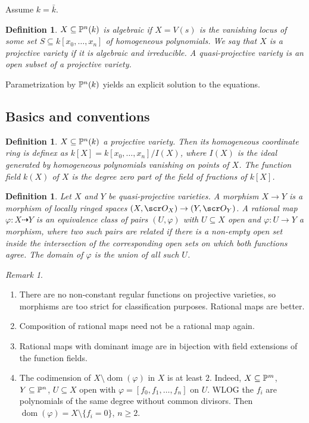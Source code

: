 \documentclass[A4paper, british, reqno]{amsart}
\theoremstyle{darkgreentheorem}
\theoremstyle{darkbluedefinition}
\newtheorem{defn}[thm]{Definition}
\theoremstyle{darkredexample}
\theoremstyle{remark}
\newtheorem{rem}[thm]{Remark}
\newcommand{\1}{\mathbbm{1}}
\newcommand{\sub}{\subseteq}
\begin{document}
Assume $k=\bar{k}$.

\begin{defn}
    $X\sub \P^{n}(k)$ is \textit{algebraic} if $X=V(s)$ is the vanishing locus of some set $S\sub k[x_{0},\ldots,x_{n}]$ of homogeneous polynomials.
    We say that $X$ is a \textit{projective variety} if it is algebraic and irreducible.
    A \textit{quasi-projective variety} is an open subset of a projective variety.
\end{defn}

Parametrization by $\P^{n}(k)$ yields an explicit solution to the equations.

\subsection{Basics and conventions}

\begin{defn}
    $X\sub \P^{n}(k)$ a projective variety.
    Then its \textit{homogeneous coordinate ring} is definex as $k[X]=k[x_{0},\ldots,x_{n}]/I(X)$, where $I(X)$ is the ideal generated by homogeneous polynomials vanishing on points of $X$.
    The \textit{function field} $k(X)$ of $X$ is the degree zero part of the field of fractions of $k[X]$.
\end{defn}

\begin{defn}
    Let $X$ and $Y$ be quasi-projective varieties.
    A \textit{morphism} $X\to Y$ is a morphism of locally ringed spaces $(X,\O_{X})\to (Y,\O_{Y})$.
    A \textit{rational map} $\varphi\colon X\dashrightarrow Y$ is an equivalence class of pairs $(U,\varphi)$ with $U\sub X$ open and $\varphi\colon U\to Y$ a morphism, where two such pairs are related if there is a non-empty open set inside the intersection of the corresponding open sets on which both functions agree.
    The domain of $\varphi$ is the union of all such $U$.
\end{defn}

\begin{rem}
    \begin{enumerate}
	\item There are no non-constant regular functions on projective varieties, so morphisms are too strict for classification purposes.
	    Rational maps are better.
	\item Composition of rational maps need not be a rational map again.
	\item Rational maps with dominant image are in bijection with field extensions of the function fields.
	\item The codimension of $X\setminus \operatorname{dom}(\varphi)$ in $X$ is at least $2$.
	    Indeed, $X\sub \P^{m}$, $Y\sub \P^{n}$, $U\sub X$ open with $\varphi=[f_{0},f_{1},\ldots,f_{n}]$ on $U$.
	    WLOG the $f_{i}$ are polynomials of the same degree without common divisors.
	    Then $\operatorname{dom}(\varphi)=X\setminus \{ f_{i}=0\}$, $n\geqslant 2$.
    \end{enumerate}
\end{rem}
\end{document}
